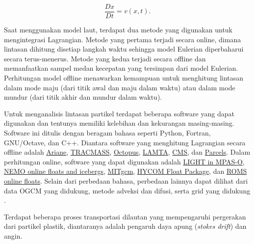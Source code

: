 \begin{spacing}{1.5}
	\begin{equation*}
		\frac{Dx}{Dt}=v(x,t).
	\end{equation*}
	\par Saat menggunakan model laut, terdapat dua metode yang digunakan untuk mengintegrasi Lagrangian. Metode yang pertama terjadi secara online, dimana lintasan dihitung disetiap langkah waktu sehingga model Eulerian diperbaharui secara terus-menerus. Metode yang kedua terjadi secara offline dan memanfaatkan sampel medan kecepatan yang tersimpan dari model Eulerian. Perhitungan model offline menawarkan kemampuan untuk menghitung lintasan dalam mode maju (dari titik awal dan maju dalam waktu) atau dalam mode mundur (dari titik akhir dan mundur dalam waktu).
	\par Untuk menganalisis lintasan partikel terdapat beberapa software yang dapat digunakan dan tentunya memiliki kelebihan dan kekurangan masing-masing. Software ini ditulis dengan beragam bahasa seperti Python, Fortran, GNU/Octave, dan C++. Diantara software yang menghitung Lagrangian secara offline adalah \href{https://www.univ-brest.fr/lpo/ariane}{Ariane}, \href{tracmass.org}{TRACMASS}, \href{https://github.com/jinbow/Octopus}{Octopus}, \href{https://bitbucket.org/f_nencio/spasso/overview}{LAMTA}, \href{https://github.com/beatrixparis/connectivity-modeling-system}{CMS}, dan \href{oceanparcels.org}{Parcels}. Dalam perhitungan online, software yang dapat digunakan adalah \href{mpas-dev.github.io}{LIGHT in MPAS-O}, \href{nemo-ocean.eu/About-NEMO/Reference-manuals}{NEMO online floats and icebergs}, \href{mitgcm.org}{MITgcm}, \href{hycom.org}{HYCOM Float Package}, dan \href{myroms.org/wiki/floats.in}{ROMS online floats}. Selain dari perbedaan bahasa, perbedaan lainnya dapat dilihat dari data OGCM yang didukung, metode adveksi dan difusi, serta grid yang didukung .
	\par Terdapat beberapa proses transportasi dilautan yang mempengaruhi pergerakan dari partikel plastik, diantaranya adalah pengaruh daya apung (\textit{stokes drift}) dan angin.

\end{spacing}
